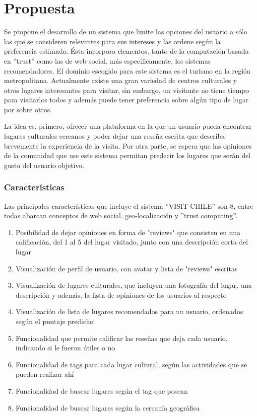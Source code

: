 \chapter{Propuesta}

Se propone el desarrollo de un sistema que limite las opciones del usuario a sólo las que se consideren relevantes para sus intereses y las ordene según la preferencia estimada. Ésta incorpora elementos, tanto de la computación basada en ''trust'' como las de web social, más específicamente, los sistemas recomendadores. El dominio escogido para este sistema es el turismo en la región metropolitana. Actualmente existe una gran variedad de centros culturales y otros lugares interesantes para visitar, sin embargo, un visitante no tiene tiempo para visitarlos todos y además puede tener preferencia sobre algún tipo de lugar por sobre otros. 

La idea es, primero, ofrecer una plataforma en la que un usuario pueda encontrar lugares culturales cercanos y poder dejar una reseña escrita que describa brevemente la experiencia de la visita. Por otra parte, se espera que las opiniones de la comunidad que use este sistema permitan predecir los lugares que serán del gusto del usuario objetivo. 


\subsection{Características}
\label{subsection:caracteristicas}
Las principales características que incluye el sistema ''VISIT CHILE'' son 8, entre todas abarcan conceptos de web social, geo-localización y ''trust computing''.

\begin{enumerate}
\item{Posibilidad de dejar opiniones en forma de "reviews" que consisten en una calificación, del 1 al 5 del lugar visitado, junto con una descripción corta del lugar }
\item{Visualización de perfil de usuario, con avatar y lista de "reviews" escritas}
\item{Visualización de lugares culturales, que incluyen una fotografía del lugar, una descripción y además, la lista de opiniones de los usuarios al respecto}
\item{Visualización de lista de lugares recomendados para un usuario, ordenados según el puntaje predicho}
\item{Funcionalidad que permite calificar las reseñas que deja cada usuario, indicando si le fueron útiles o no}
\item{Funcionalidad de tags para cada lugar cultural, según las actividades que se pueden realizar ahí}
\item{Funcionalidad de buscar lugares según el tag que posean}
\item{Funcionalidad de buscar lugares según la cercanía geográfica}
\end{enumerate}

